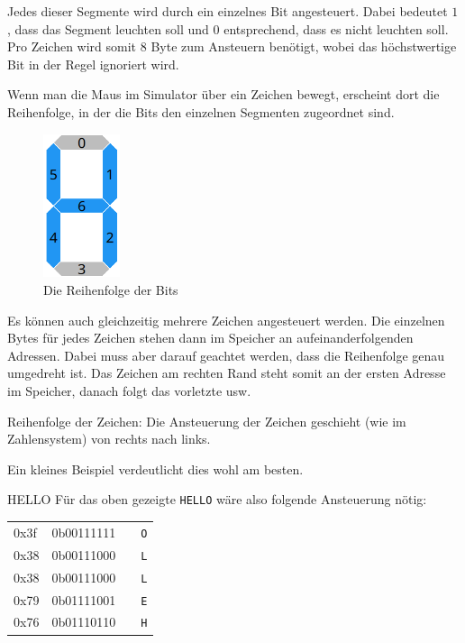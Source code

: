 Jedes dieser Segmente wird durch ein einzelnes Bit angesteuert. Dabei bedeutet $1$, dass das Segment leuchten soll und $0$ entsprechend, dass es nicht leuchten soll.
Pro Zeichen wird somit 8 Byte zum Ansteuern benötigt, wobei das höchstwertige Bit in der Regel ignoriert wird.

Wenn man die Maus im Simulator über ein Zeichen bewegt, erscheint dort die Reihenfolge, in der die Bits den einzelnen Segmenten zugeordnet sind.

\begin{figure}[ht]
	\centering
  \includegraphics[width=0.2\textwidth]{Images/7-Segment_Hover}
	\caption{Die Reihenfolge der Bits}
	\label{7-Segment_Hover}
\end{figure}

Es können auch gleichzeitig mehrere Zeichen angesteuert werden. Die einzelnen Bytes für jedes Zeichen stehen dann im Speicher an aufeinanderfolgenden Adressen.
Dabei muss aber darauf geachtet werden, dass die Reihenfolge genau umgedreht ist. Das Zeichen am rechten Rand steht somit an der ersten Adresse im Speicher,
danach folgt das vorletzte usw.

\begin{warningblock}
Reihenfolge der Zeichen: Die Ansteuerung der Zeichen geschieht (wie im Zahlensystem) von rechts nach links.
\end{warningblock}

Ein kleines Beispiel verdeutlicht dies wohl am besten.

\begin{exampleblock}{HELLO}
	Für das oben gezeigte \texttt{HELLO} wäre also folgende Ansteuerung nötig:\\
	\begin{tabular}{llll}
	0x3f & 0b00111111 & & \texttt{O}\\
	0x38 & 0b00111000 & & \texttt{L}\\
	0x38 & 0b00111000 & & \texttt{L}\\
	0x79 & 0b01111001 & & \texttt{E}\\
	0x76 & 0b01110110 & & \texttt{H}\\
	\end{tabular}
\end{exampleblock}

